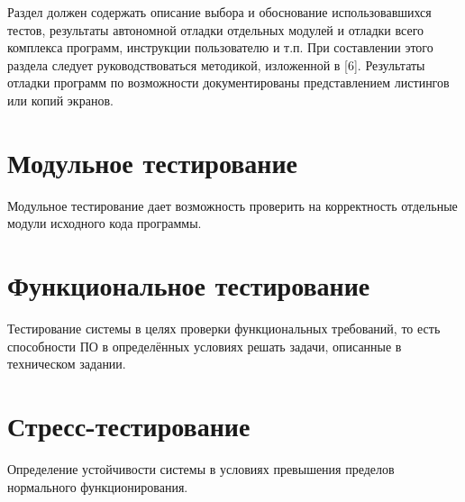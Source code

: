 Раздел должен содержать описание выбора и обоснование
использовавшихся тестов, результаты автономной отладки отдельных модулей и отладки всего
комплекса программ, инструкции пользователю и т.п. При составлении этого раздела следует
руководствоваться методикой, изложенной в [6]. Результаты отладки программ по возможности
документированы представлением листингов или копий экранов.

\section{Модульное тестирование}
Модульное тестирование дает возможность проверить на корректность отдельные модули исходного кода программы.

\section{Функциональное тестирование}
Тестирование системы в целях проверки функциональных требований, то есть способности ПО в определённых условиях решать задачи, описанные в техническом задании.

\section{Стресс-тестирование}
Определение устойчивости системы в условиях превышения пределов нормального функционирования.